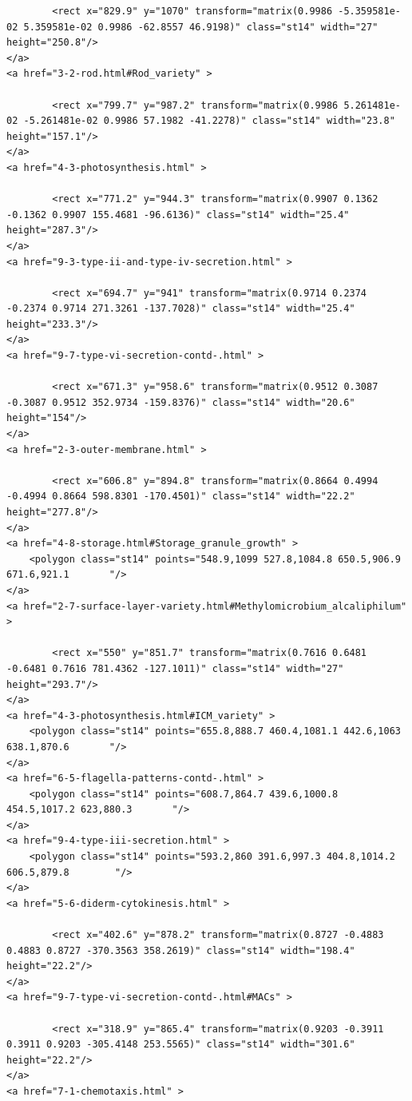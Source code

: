 \documentclass[]{tufte-book}
\begin{document}
\begin{verbatim}
        <rect x="829.9" y="1070" transform="matrix(0.9986 -5.359581e-02 5.359581e-02 0.9986 -62.8557 46.9198)" class="st14" width="27" height="250.8"/>
</a>
<a href="3-2-rod.html#Rod_variety" >

        <rect x="799.7" y="987.2" transform="matrix(0.9986 5.261481e-02 -5.261481e-02 0.9986 57.1982 -41.2278)" class="st14" width="23.8" height="157.1"/>
</a>
<a href="4-3-photosynthesis.html" >

        <rect x="771.2" y="944.3" transform="matrix(0.9907 0.1362 -0.1362 0.9907 155.4681 -96.6136)" class="st14" width="25.4" height="287.3"/>
</a>
<a href="9-3-type-ii-and-type-iv-secretion.html" >

        <rect x="694.7" y="941" transform="matrix(0.9714 0.2374 -0.2374 0.9714 271.3261 -137.7028)" class="st14" width="25.4" height="233.3"/>
</a>
<a href="9-7-type-vi-secretion-contd-.html" >

        <rect x="671.3" y="958.6" transform="matrix(0.9512 0.3087 -0.3087 0.9512 352.9734 -159.8376)" class="st14" width="20.6" height="154"/>
</a>
<a href="2-3-outer-membrane.html" >

        <rect x="606.8" y="894.8" transform="matrix(0.8664 0.4994 -0.4994 0.8664 598.8301 -170.4501)" class="st14" width="22.2" height="277.8"/>
</a>
<a href="4-8-storage.html#Storage_granule_growth" >
    <polygon class="st14" points="548.9,1099 527.8,1084.8 650.5,906.9 671.6,921.1       "/>
</a>
<a href="2-7-surface-layer-variety.html#Methylomicrobium_alcaliphilum" >

        <rect x="550" y="851.7" transform="matrix(0.7616 0.6481 -0.6481 0.7616 781.4362 -127.1011)" class="st14" width="27" height="293.7"/>
</a>
<a href="4-3-photosynthesis.html#ICM_variety" >
    <polygon class="st14" points="655.8,888.7 460.4,1081.1 442.6,1063 638.1,870.6       "/>
</a>
<a href="6-5-flagella-patterns-contd-.html" >
    <polygon class="st14" points="608.7,864.7 439.6,1000.8 454.5,1017.2 623,880.3       "/>
</a>
<a href="9-4-type-iii-secretion.html" >
    <polygon class="st14" points="593.2,860 391.6,997.3 404.8,1014.2 606.5,879.8        "/>
</a>
<a href="5-6-diderm-cytokinesis.html" >

        <rect x="402.6" y="878.2" transform="matrix(0.8727 -0.4883 0.4883 0.8727 -370.3563 358.2619)" class="st14" width="198.4" height="22.2"/>
</a>
<a href="9-7-type-vi-secretion-contd-.html#MACs" >

        <rect x="318.9" y="865.4" transform="matrix(0.9203 -0.3911 0.3911 0.9203 -305.4148 253.5565)" class="st14" width="301.6" height="22.2"/>
</a>
<a href="7-1-chemotaxis.html" >


\end{verbatim}
\end{document}
